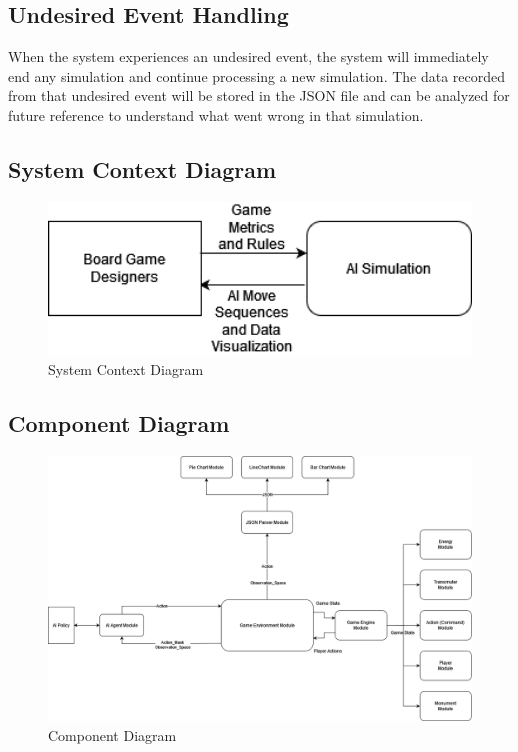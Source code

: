 \documentclass[12pt, titlepage]{article}
\begin{document}
\subsection{Undesired Event Handling}
When the system experiences an undesired event, the system will immediately end any simulation and continue processing a new simulation. The data recorded from that undesired event will be stored in the JSON file and can be analyzed for future reference to understand what went wrong in that simulation. 
\subsection{System Context Diagram}
\begin{figure}[h!]
\begin{center}
 \includegraphics[width=1.0\textwidth]{System_context.png}
\caption{System Context Diagram}
\label{Fig_SystemContext} 
\end{center}
\end{figure}
\newpage
\subsection{Component Diagram}
\begin{figure}[h!]
\begin{center}
 \includegraphics[width=1.0\textwidth]{Component_diagram.png}
\caption{Component Diagram}
\label{Fig_SystemContext} 
\end{center}
\end{figure}
\newpage
\end{document}

